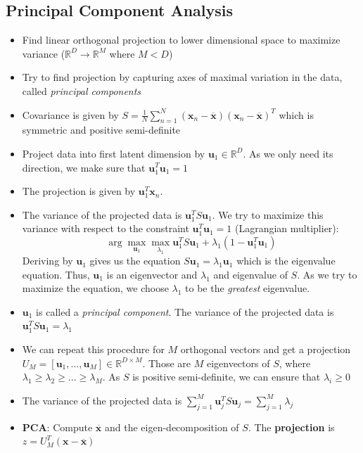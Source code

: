 \subsection{Principal Component Analysis}
\begin{itemize}
	\item Find linear orthogonal projection to lower dimensional space to maximize variance ($\mathbb{R}^{D}\to \mathbb{R}^{M}$ where $M<D$)
	\item Try to find projection by capturing axes of maximal variation in the data, called \textit{principal components}
	\item Covariance is given by $S=\frac{1}{N}\sum\limits_{n=1}^{N}\left(\bm{x}_n - \overline{\bm{x}}\right)\left(\bm{x}_n - \overline{\bm{x}}\right)^T$  which is symmetric and positive semi-definite
	\item Project data into first latent dimension by $\bm{u}_1 \in \mathbb{R}^D$. As we only need its direction, we make sure that $\bm{u}_1^T \bm{u}_1 = 1$
	\item The projection is given by $\bm{u}_1^T \bm{x}_n$.
	\item The variance of the projected data is $\bm{u}_1^T S \bm{u}_1$. We try to maximize this variance with respect to the constraint $\bm{u}_1^T \bm{u}_1 = 1$ (Lagrangian multiplier):
	$$\arg\max_{\bm{u}_1}\max_{\lambda_1} \bm{u}_1^T S \bm{u}_1 + \lambda_1 (1 - \bm{u}_1^T \bm{u}_1)$$
	Deriving by $\bm{u}_1$ gives us the equation $S\bm{u}_1 = \lambda_1 \bm{u}_1$ which is the eigenvalue equation. Thus, $\bm{u}_1$ is an eigenvector and $\lambda_1$ and eigenvalue of $S$. As we try to maximize the equation, we choose $\lambda_1$ to be the \textit{greatest} eigenvalue.
	\item $\bm{u}_1$ is called a \textit{principal component}. The variance of the projected data is $\bm{u}_1^T S \bm{u}_1 = \lambda_1$
	\item We can repeat this procedure for $M$ orthogonal vectors and get a projection $U_M = \left[\bm{u}_1, ..., \bm{u}_M\right] \in \mathbb{R}^{D\times M}$. Those are $M$ eigenvectors of $S$, where $\lambda_1 \geq \lambda_2 \geq ... \geq \lambda_M$. As $S$ is positive semi-definite, we can ensure that $\lambda_i\geq 0$
	\item The variance of the projected data is $\sum\limits_{j=1}^{M} \bm{u}_j^T S \bm{u}_j = \sum\limits_{j=1}^{M} \lambda_j$
	\item \textbf{PCA}: Compute $\overline{\bm{x}}$ and the eigen-decomposition of $S$. The \textbf{projection} is $z = U_M^T \left(\bm{x} - \overline{\bm{x}}\right)$

\end{itemize}
